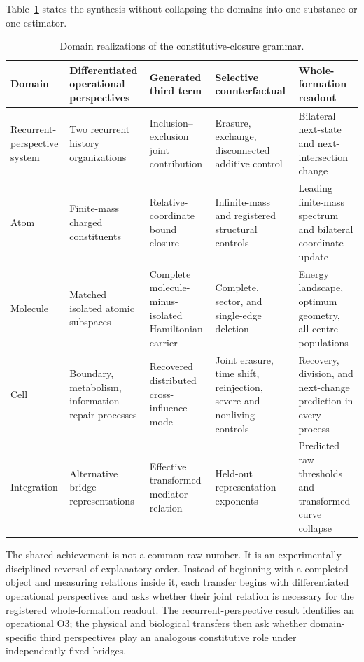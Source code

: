 \documentclass[11pt,a4paper]{article}
\begin{document}
Table~\ref{tab:cross-domain-map} states the synthesis without collapsing the domains into one substance or one estimator.

\begin{table}[H]
\centering
\scriptsize
\caption{Domain realizations of the constitutive-closure grammar.}
\label{tab:cross-domain-map}
\begin{tabularx}{\textwidth}{@{}>{\raggedright\arraybackslash}p{1.45cm}>{\raggedright\arraybackslash}p{3.05cm}>{\raggedright\arraybackslash}p{3.25cm}>{\raggedright\arraybackslash}p{3.25cm}>{\raggedright\arraybackslash}X@{}}
\toprule
Domain & Differentiated operational perspectives & Generated third term & Selective counterfactual & Whole-formation readout \\
\midrule
Recurrent-perspective system & Two recurrent history organizations & Inclusion--exclusion joint contribution & Erasure, exchange, disconnected additive control & Bilateral next-state and next-intersection change \\
Atom & Finite-mass charged constituents & Relative-coordinate bound closure & Infinite-mass and registered structural controls & Leading finite-mass spectrum and bilateral coordinate update \\
Molecule & Matched isolated atomic subspaces & Complete molecule-minus-isolated Hamiltonian carrier & Complete, sector, and single-edge deletion & Energy landscape, optimum geometry, all-centre populations \\
Cell & Boundary, metabolism, information-repair processes & Recovered distributed cross-influence mode & Joint erasure, time shift, reinjection, severe and nonliving controls & Recovery, division, and next-change prediction in every process \\
Integration & Alternative bridge representations & Effective transformed mediator relation & Held-out representation exponents & Predicted raw thresholds and transformed curve collapse \\
\bottomrule
\end{tabularx}
\end{table}

The shared achievement is not a common raw number. It is an experimentally disciplined reversal of explanatory order. Instead of beginning with a completed object and measuring relations inside it, each transfer begins with differentiated operational perspectives and asks whether their joint relation is necessary for the registered whole-formation readout. The recurrent-perspective result identifies an operational O3; the physical and biological transfers then ask whether domain-specific third perspectives play an analogous constitutive role under independently fixed bridges.
\end{document}
